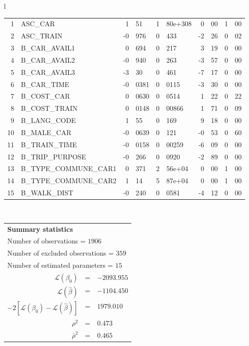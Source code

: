 \begin{tabular}{l}
\begin{tabular}{rlr@{.}lr@{.}lr@{.}lr@{.}l}
1 & ASC_CAR & 1&51 & 1&80e+308 & 0&00 & 1&00\\
2 & ASC_TRAIN & -0&976 & 0&433 & -2&26 & 0&02\\
3 & B_CAR_AVAIL1 & 0&694 & 0&217 & 3&19 & 0&00\\
4 & B_CAR_AVAIL2 & -0&940 & 0&263 & -3&57 & 0&00\\
5 & B_CAR_AVAIL3 & -3&30 & 0&461 & -7&17 & 0&00\\
6 & B_CAR_TIME & -0&0381 & 0&0115 & -3&30 & 0&00\\
7 & B_COST_CAR & 0&0630 & 0&0514 & 1&22 & 0&22\\
8 & B_COST_TRAIN & 0&0148 & 0&00866 & 1&71 & 0&09\\
9 & B_LANG_CODE & 1&55 & 0&169 & 9&18 & 0&00\\
10 & B_MALE_CAR & -0&0639 & 0&121 & -0&53 & 0&60\\
11 & B_TRAIN_TIME & -0&0158 & 0&00259 & -6&09 & 0&00\\
12 & B_TRIP_PURPOSE & -0&266 & 0&0920 & -2&89 & 0&00\\
13 & B_TYPE_COMMUNE_CAR1 & 0&371 & 2&56e+04 & 0&00 & 1&00\\
14 & B_TYPE_COMMUNE_CAR2 & 1&14 & 5&87e+04 & 0&00 & 1&00\\
15 & B_WALK_DIST & -0&240 & 0&0581 & -4&12 & 0&00\\
\hline
\end{tabular}
\\
\begin{tabular}{rcl}
\multicolumn{3}{l}{\bf Summary statistics}\\
\multicolumn{3}{l}{ Number of observations = $1906$} \\
\multicolumn{3}{l}{ Number of excluded observations = $359$} \\
\multicolumn{3}{l}{ Number of estimated  parameters = $15$} \\
 $\mathcal{L}(\beta_0)$ &=&  $-2093.955$ \\
 $\mathcal{L}(\hat{\beta})$ &=& $-1104.450 $  \\
 $-2[\mathcal{L}(\beta_0) -\mathcal{L}(\hat{\beta})]$ &=& $1979.010$ \\
    $\rho^2$ &=&   $0.473$ \\
    $\bar{\rho}^2$ &=&    $0.465$ \\
\end{tabular}
  \end{tabular}
